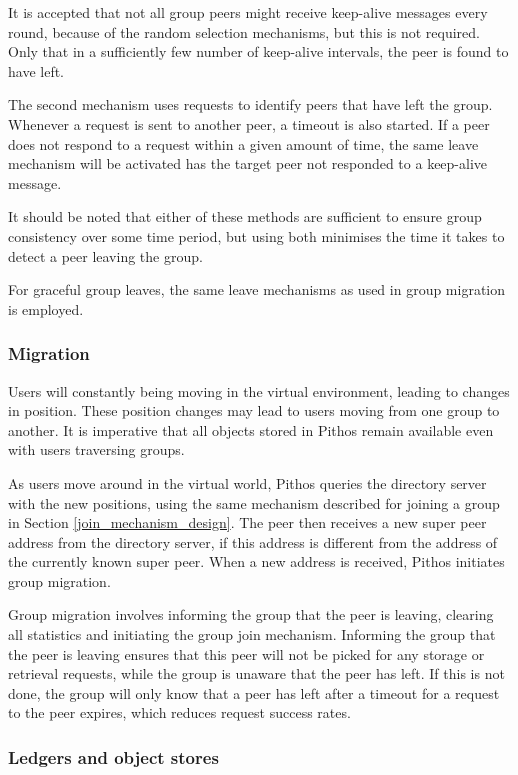 It is accepted that not all group peers might receive keep-alive messages every round, because of the random selection mechanisms, but this is not required. Only that in a sufficiently few number of keep-alive intervals, the peer is found to have left.

The second mechanism uses requests to identify peers that have left the group. Whenever a request is sent to another peer, a timeout is also started. If a peer does not respond to a request within a given amount of time, the same leave mechanism will be activated has the target peer not responded to a keep-alive message.

It should be noted that either of these methods are sufficient to ensure group consistency over some time period, but using both minimises the time it takes to detect a peer leaving the group.

For graceful group leaves, the same leave mechanisms as used in group migration is employed.

\subsubsection{Migration}
\label{migration_design}

Users will constantly being moving in the virtual environment, leading to changes in position. These position changes may lead to users moving from one group to another. It is imperative that all objects stored in Pithos remain available even with users traversing groups.

As users move around in the virtual world, Pithos queries the directory server with the new positions, using the same mechanism described for joining a group in Section \ref{join_mechanism_design}. The peer then receives a new super peer address from the directory server, if this address is different from the address of the currently known super peer. When a new address is received, Pithos initiates group migration.

Group migration involves informing the group that the peer is leaving, clearing all statistics and initiating the group join mechanism. Informing the group that the peer is leaving ensures that this peer will not be picked for any storage or retrieval requests, while the group is unaware that the peer has left. If this is not done, the group will only know that a peer has left after a timeout for a request to the peer expires, which reduces request success rates.

\subsubsection{Ledgers and object stores}

